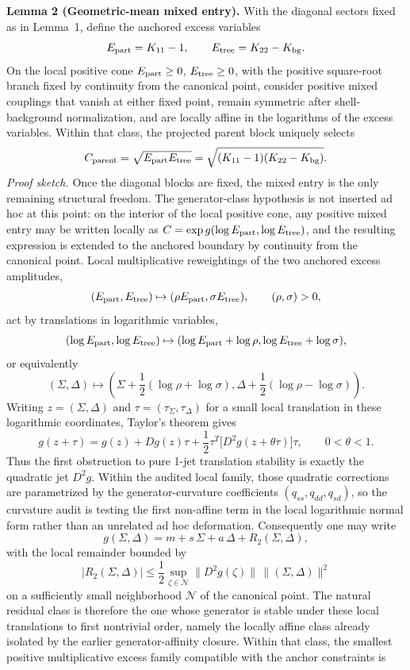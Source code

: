\documentclass[aps,prd,onecolumn,notitlepage,nofootinbib,superscriptaddress,11pt,floatfix]{revtex4-2}
\begin{document}
\noindent\textbf{Lemma 2 (Geometric-mean mixed entry).}
With the diagonal sectors fixed as in Lemma~1, define the anchored excess variables
\[
E_{\rm part}=K_{11}-1,
\qquad
E_{\rm tree}=K_{22}-K_{\rm bg}.
\]
On the local positive cone \(E_{\rm part}\ge 0\), \(E_{\rm tree}\ge 0\), with the positive square-root branch fixed by continuity from the canonical point, consider positive mixed couplings that vanish at either fixed point, remain symmetric after shell-background normalization, and are locally affine in the logarithms of the excess variables. Within that class, the projected parent block uniquely selects
\[
C_{\rm parent}=\sqrt{E_{\rm part}E_{\rm tree}}
=
\sqrt{(K_{11}-1)(K_{22}-K_{\rm bg})}.
\]
\emph{Proof sketch.}
Once the diagonal blocks are fixed, the mixed entry is the only remaining structural freedom. The generator-class hypothesis is not inserted ad hoc at this point: on the interior of the local positive cone, any positive mixed entry may be written locally as \(C=\exp g(\log E_{\rm part},\log E_{\rm tree})\), and the resulting expression is extended to the anchored boundary by continuity from the canonical point. Local multiplicative reweightings of the two anchored excess amplitudes,
\[
(E_{\rm part},E_{\rm tree})\mapsto (\rho E_{\rm part},\sigma E_{\rm tree}),
\qquad
(\rho,\sigma)>0,
\]
act by translations in logarithmic variables,
\[
(\log E_{\rm part},\log E_{\rm tree})
\mapsto
(\log E_{\rm part}+\log\rho,\log E_{\rm tree}+\log\sigma),
\]
or equivalently
\[
(\Sigma,\Delta)\mapsto
\left(
\Sigma+\frac12(\log\rho+\log\sigma),
\Delta+\frac12(\log\rho-\log\sigma)
\right).
\]
Writing \(z=(\Sigma,\Delta)\) and \(\tau=(\tau_\Sigma,\tau_\Delta)\) for a small local translation in these logarithmic coordinates, Taylor's theorem gives
\[
g(z+\tau)=g(z)+Dg(z)\tau+\frac12\tau^T\bigl[D^2g(z+\theta\tau)\bigr]\tau,
\qquad
0<\theta<1.
\]
Thus the first obstruction to pure 1-jet translation stability is exactly the quadratic jet \(D^2g\). Within the audited local family, those quadratic corrections are parametrized by the generator-curvature coefficients \((q_{ss},q_{dd},q_{sd})\), so the curvature audit is testing the first non-affine term in the local logarithmic normal form rather than an unrelated ad hoc deformation. Consequently one may write
\[
g(\Sigma,\Delta)
=
m+s\,\Sigma+a\,\Delta+R_2(\Sigma,\Delta),
\]
with the local remainder bounded by
\[
|R_2(\Sigma,\Delta)|
\le
\frac12
\sup_{\zeta\in\mathcal N}\|D^2g(\zeta)\|\,\|(\Sigma,\Delta)\|^2
\]
on a sufficiently small neighborhood \(\mathcal N\) of the canonical point. The natural residual class is therefore the one whose generator is stable under these local translations to first nontrivial order, namely the locally affine class already isolated by the earlier generator-affinity closure. Within that class, the smallest positive multiplicative excess family compatible with the anchor constraints is
\end{document}
